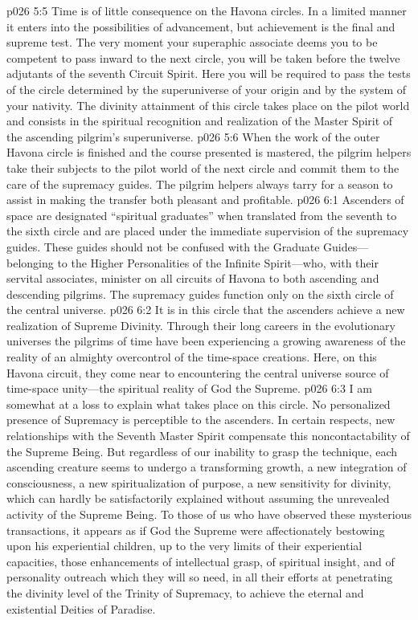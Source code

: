 \vs p026 5:5 Time is of little consequence on the Havona circles. In a limited manner it enters into the possibilities of advancement, but achievement is the final and supreme test. The very moment your superaphic associate deems you to be competent to pass inward to the next circle, you will be taken before the twelve adjutants of the seventh Circuit Spirit. Here you will be required to pass the tests of the circle determined by the superuniverse of your origin and by the system of your nativity. The divinity attainment of this circle takes place on the pilot world and consists in the spiritual recognition and realization of the Master Spirit of the ascending pilgrim’s superuniverse.
\vs p026 5:6 When the work of the outer Havona circle is finished and the course presented is mastered, the pilgrim helpers take their subjects to the pilot world of the next circle and commit them to the care of the supremacy guides. The pilgrim helpers always tarry for a season to assist in making the transfer both pleasant and profitable.
\vs p026 6:1 Ascenders of space are designated “spiritual graduates” when translated from the seventh to the sixth circle and are placed under the immediate supervision of the supremacy guides. These guides should not be confused with the Graduate Guides---belonging to the Higher Personalities of the Infinite Spirit---who, with their servital associates, minister on all circuits of Havona to both ascending and descending pilgrims. The supremacy guides function only on the sixth circle of the central universe.
\vs p026 6:2 It is in this circle that the ascenders achieve a new realization of Supreme Divinity. Through their long careers in the evolutionary universes the pilgrims of time have been experiencing a growing awareness of the reality of an almighty overcontrol of the time\hyp{}space creations. Here, on this Havona circuit, they come near to encountering the central universe source of time\hyp{}space unity---the spiritual reality of God the Supreme.
\vs p026 6:3 I am somewhat at a loss to explain what takes place on this circle. No personalized presence of Supremacy is perceptible to the ascenders. In certain respects, new relationships with the Seventh Master Spirit compensate this noncontactability of the Supreme Being. But regardless of our inability to grasp the technique, each ascending creature seems to undergo a transforming growth, a new integration of consciousness, a new spiritualization of purpose, a new sensitivity for divinity, which can hardly be satisfactorily explained without assuming the unrevealed activity of the Supreme Being. To those of us who have observed these mysterious transactions, it appears as if God the Supreme were affectionately bestowing upon his experiential children, up to the very limits of their experiential capacities, those enhancements of intellectual grasp, of spiritual insight, and of personality outreach which they will so need, in all their efforts at penetrating the divinity level of the Trinity of Supremacy, to achieve the eternal and existential Deities of Paradise.\plusone
